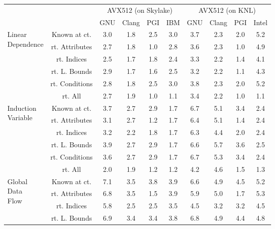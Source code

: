 \documentclass{article}
\begin{document}
\begin{longtable}{|p{2cm}|c|c|c|c|c|c|c|c|c|}
\cline{3-10} \multicolumn{2}{c|}{} & \multicolumn{4}{|c|}{ AVX512 (on Skylake)} & \multicolumn{4}{|c|}{ AVX512 (on KNL)} \\
\cline{3-10} \multicolumn{2}{c|}{}& GNU & Clang & PGI & IBM & GNU & Clang & PGI & Intel \\ \hline
\multirow{6}{*}{ \parbox{2cm}{Linear\\Dependence}} & Known at ct. & 3.0 & 1.8 & 2.5 & 3.0 & 3.7 & 2.3 & 2.0 & 5.2\\ \cline{2-10}
 & rt. Attributes & 2.7 & 1.8 & 1.0 & 2.8 & 3.6 & 2.3 & 1.0 & 4.9\\ \cline{2-10}
 & rt. Indices & 2.5 & 1.7 & 1.8 & 2.4 & 3.3 & 2.2 & 1.4 & 4.1\\ \cline{2-10}
 & rt. L. Bounds & 2.9 & 1.7 & 1.6 & 2.5 & 3.2 & 2.2 & 1.1 & 4.3\\ \cline{2-10}
 & rt. Conditions & 2.8 & 1.8 & 2.5 & 3.0 & 3.8 & 2.3 & 2.0 & 5.2\\ \cline{2-10}
 & rt. All & 2.7 & 1.9 & 1.0 & 1.1 & 3.4 & 2.2 & 1.0 & 1.1\\ \cline{2-10}
\hline
\multirow{6}{*}{ \parbox{2cm}{Induction\\Variable}} & Known at ct. & 3.7 & 2.7 & 2.9 & 1.7 & 6.7 & 5.1 & 3.4 & 2.4\\ \cline{2-10}
 & rt. Attributes & 3.1 & 2.7 & 1.2 & 1.7 & 6.4 & 5.1 & 1.4 & 2.4\\ \cline{2-10}
 & rt. Indices & 3.2 & 2.2 & 1.8 & 1.7 & 6.3 & 4.4 & 2.0 & 2.4\\ \cline{2-10}
 & rt. L. Bounds & 3.9 & 2.7 & 2.9 & 1.7 & 6.6 & 5.7 & 3.6 & 2.5\\ \cline{2-10}
 & rt. Conditions & 3.6 & 2.7 & 2.9 & 1.7 & 6.7 & 5.3 & 3.4 & 2.4\\ \cline{2-10}
 & rt. All & 2.0 & 1.9 & 1.2 & 1.2 & 4.2 & 4.6 & 1.5 & 1.3\\ \cline{2-10}
\hline
\multirow{6}{*}{ \parbox{2cm}{Global\\Data\\Flow}} & Known at ct. & 7.1 & 3.5 & 3.8 & 3.9 & 6.6 & 4.9 & 4.5 & 5.2\\ \cline{2-10}
 & rt. Attributes & 6.8 & 3.5 & 1.5 & 3.9 & 5.9 & 5.0 & 1.7 & 5.3\\ \cline{2-10}
 & rt. Indices & 5.8 & 2.5 & 2.5 & 3.5 & 4.5 & 3.2 & 3.2 & 4.5\\ \cline{2-10}
 & rt. L. Bounds & 6.9 & 3.4 & 3.4 & 3.8 & 6.8 & 4.9 & 4.4 & 4.8\\ \cline{2-10}

\end{longtable}
\end{document}
